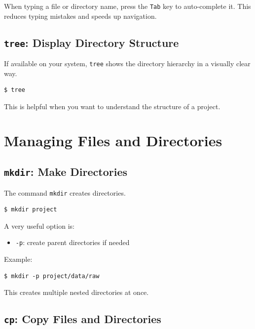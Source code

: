 \begin{protip}
When typing a file or directory name, press the \texttt{Tab} key to
auto-complete it. This reduces typing mistakes and speeds up navigation.
\end{protip}

\subsection{\texttt{tree}: Display Directory Structure}

If available on your system, \texttt{tree} shows the directory hierarchy
in a visually clear way.

\begin{lstlisting}
$ tree
\end{lstlisting}

This is helpful when you want to understand the structure of a project.

\section{Managing Files and Directories}

\subsection{\texttt{mkdir}: Make Directories}

The command \texttt{mkdir} creates directories.

\begin{lstlisting}
$ mkdir project
\end{lstlisting}

A very useful option is:

\begin{itemize}
\item \texttt{-p}: create parent directories if needed
\end{itemize}

Example:

\begin{lstlisting}
$ mkdir -p project/data/raw
\end{lstlisting}

This creates multiple nested directories at once.

\subsection{\texttt{cp}: Copy Files and Directories}

